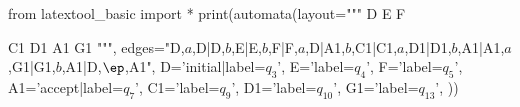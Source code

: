 from latextool_basic import *
print(automata(layout="""
   D  E  F

      C1 D1
   A1 
      G1
""",
edges="D,$a$,D|D,$b$,E|E,$b$,F|F,$a$,D|A1,$b$,C1|C1,$a$,D1|D1,$b$,A1|A1,$a$,G1|G1,$b$,A1|D,$\ep$,A1",
D='initial|label=$q_3$',
E='label=$q_4$',
F='label=$q_5$',
A1='accept|label=$q_7$',
C1='label=$q_9$',
D1='label=$q_{10}$',
G1='label=$q_{13}$',
))
